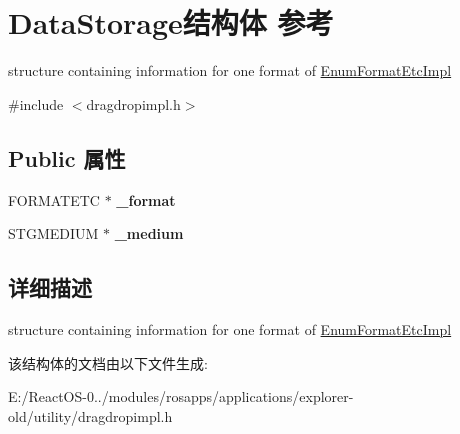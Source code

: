\hypertarget{struct_data_storage}{}\section{Data\+Storage结构体 参考}
\label{struct_data_storage}


structure containing information for one format of \hyperlink{class_enum_format_etc_impl}{Enum\+Format\+Etc\+Impl}  




{\ttfamily \#include $<$dragdropimpl.\+h$>$}

\subsection*{Public 属性}
\begin{DoxyCompactItemize}
\item 
\mbox{\label{struct_data_storage_a5ef74100382feb40d6698f248267d1bf}} 
F\+O\+R\+M\+A\+T\+E\+TC $\ast$ {\bfseries \+\_\+format}
\item 
\mbox{\label{struct_data_storage_a7d0dc7f80f46654c4ca963f839c3d126}} 
S\+T\+G\+M\+E\+D\+I\+UM $\ast$ {\bfseries \+\_\+medium}
\end{DoxyCompactItemize}


\subsection{详细描述}
structure containing information for one format of \hyperlink{class_enum_format_etc_impl}{Enum\+Format\+Etc\+Impl} 

该结构体的文档由以下文件生成\+:\begin{DoxyCompactItemize}
\item 
E\+:/\+React\+O\+S-\/0../modules/rosapps/applications/explorer-\/old/utility/dragdropimpl.\+h\end{DoxyCompactItemize}
